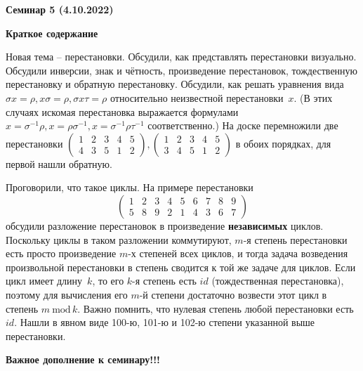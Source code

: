 \documentclass[10pt, a4paper]{extarticle}
\theoremstyle{definition}
\begin{document}
\begin{center}
\small
\noindent{}
\end{center}

\large

\begin{center}
\textbf{Семинар 5 (4.10.2022)}
\end{center}

\textbf{Краткое содержание}

Новая тема -- перестановки. Обсудили, как представлять перестановки визуально.
Обсудили инверсии, знак и чётность, произведение перестановок, тождественную перестановку и обратную перестановку.
Обсудили, как решать уравнения вида $\sigma x=\rho, x\sigma=\rho, \sigma x \tau=\rho$ относительно неизвестной перестановки~$x$.
(В этих случаях искомая перестановка выражается формулами $x = \sigma^{-1}\rho, x = \rho\sigma^{-1}, x=\sigma^{-1}\rho\tau^{-1}$ соответственно.)
На доске перемножили две перестановки $\begin{pmatrix} 1 & 2 & 3 & 4 & 5 \\ 4 & 3 & 5 & 1 & 2 \end{pmatrix}, \begin{pmatrix} 1 & 2 & 3 & 4 & 5 \\ 3& 4 & 5 & 1 & 2  \end{pmatrix}$
в обоих порядках, для первой нашли обратную.

Проговорили, что такое циклы.
На примере перестановки
\[
\begin{pmatrix} 1 & 2 & 3 & 4 & 5 & 6 & 7 & 8 & 9 \\ 5 & 8 & 9 & 2 & 1 & 4 & 3 & 6 & 7 \end{pmatrix}
\]
обсудили разложение перестановок в произведение \textbf{независимых} циклов. Поскольку циклы в таком разложении коммутируют, $m$-я степень перестановки есть просто произведение $m$-х степеней всех циклов, и тогда задача возведения произвольной перестановки в степень сводится к той же задаче для циклов.
Если цикл имеет длину~$k$, то его $k$-я степень есть $id$ (тождественная перестановка), поэтому для вычисления его $m$-й степени достаточно возвести этот цикл в степень $m \ \mathrm{mod}\, k$.
Важно помнить, что нулевая степень любой перестановки есть~$id$.
Нашли в явном виде 100-ю, 101-ю и 102-ю степени указанной выше перестановки.

\textbf{Важное дополнение к семинару!!!}
\end{document}
